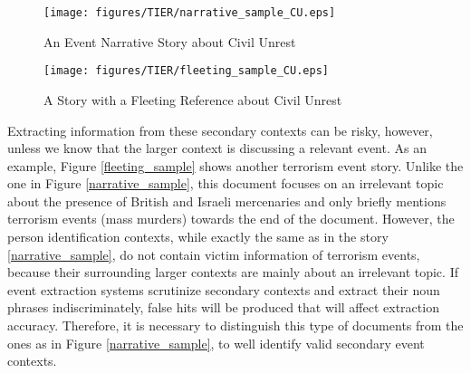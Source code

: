  \begin{figure}[h]
 \centering
 \texttt{[image: figures/TIER/narrative\_sample\_CU.eps]}
 \caption{An Event Narrative Story about Civil Unrest}
\label{narrative_sample_CU}
\end{figure} 

  \begin{figure}[h]
 \centering
 \texttt{[image: figures/TIER/fleeting\_sample\_CU.eps]}
 \caption{A Story with a Fleeting Reference about Civil Unrest}
\label{fleeting_sample_CU}
\end{figure} 

Extracting information from these secondary
contexts can be risky, however, unless we know that the larger context
is discussing a relevant event. As an example, Figure \ref{fleeting_sample} 
shows another terrorism event story.
Unlike the one in Figure \ref{narrative_sample}, this document 
focuses on an irrelevant topic about the presence of British and 
Israeli mercenaries and only briefly mentions terrorism events 
(mass murders) towards the end of the document. 
However, the person identification contexts, while exactly 
the same as in the story \ref{narrative_sample}, do not contain 
victim information of terrorism events, because their surrounding 
larger contexts are mainly about an irrelevant topic. 
If event extraction systems scrutinize secondary contexts and 
extract their noun phrases indiscriminately, 
false hits will be produced that will affect extraction accuracy.
Therefore, it is necessary to distinguish 
this type of documents from the ones as in Figure \ref{narrative_sample}, 
to well identify valid secondary event contexts.

